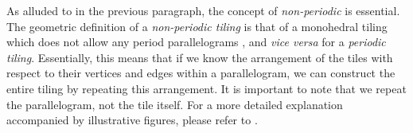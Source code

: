 \documentclass[../thesis.tex]{subfiles}
\begin{document}
As alluded to in the previous paragraph, the concept of \emph{non-periodic} is essential. The geometric definition of a \emph{non-periodic tiling} is that of a monohedral tiling which does not allow any period parallelograms \cite{penrosePentaplexityClassNonPeriodic1979}, and \emph{vice versa} for a \emph{periodic tiling}. Essentially, this means that if we know the arrangement of the tiles with respect to their vertices and edges within a parallelogram, we can construct the entire tiling by repeating this arrangement. It is important to note that we repeat the parallelogram, not the tile itself. For a more detailed explanation accompanied by illustrative figures, please refer to \cite[p.29-30,147-149]{grunbaumTilingsPatterns1987}. 
\end{document}
